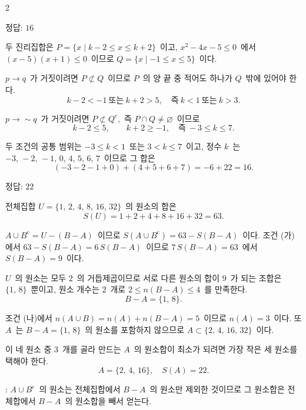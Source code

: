\documentclass[10pt,fleqn]{article}
\begin{document}
\dmsoltitlefirsttrue
\begin{multicols*}{2}

\begin{dmanswerbox}
정답: $16$
\end{dmanswerbox}

두 진리집합은 $P=\{x\mid k-2\le x\le k+2\}$\ 이고, $x^{2}-4x-5\le 0$\ 에서 $(x-5)(x+1)\le 0$\ 이므로 $Q=\{x\mid -1\le x\le 5\}$\ 이다.

$p\to q$\ 가 거짓이려면 $P\not\subset Q$\ 이므로 $P$\ 의 양 끝 중 적어도 하나가 $Q$\ 밖에 있어야 한다.
\[ k-2<-1\ \text{또는}\ k+2>5,\quad\text{즉}\ k<1\ \text{또는}\ k>3. \]

$p\to\sim q$\ 가 거짓이려면 $P\not\subset Q^{\mathrm{c}}$,\ 즉 $P\cap Q\ne\varnothing$\ 이므로
\[ k-2\le 5,\qquad k+2\ge -1,\quad\text{즉}\ -3\le k\le 7. \]

두 조건의 공통 범위는 $-3\le k<1$\ 또는 $3<k\le 7$\ 이고, 정수 $k$\ 는 $-3,\,-2,\,-1,\,0,\,4,\,5,\,6,\,7$\ 이므로 그 합은
\[ (-3-2-1+0)+(4+5+6+7)=-6+22=16. \]
\begin{dmanswerbox}
정답: $22$
\end{dmanswerbox}

전체집합 $U=\{1,\,2,\,4,\,8,\,16,\,32\}$\ 의 원소의 합은
\[ S(U)=1+2+4+8+16+32=63. \]

$A\cup B^{\mathrm{c}}=U-(B-A)$\ 이므로 $S(A\cup B^{\mathrm{c}})=63-S(B-A)$\ 이다. 조건 (가)에서 $63-S(B-A)=6\,S(B-A)$\ 이므로 $7\,S(B-A)=63$\ 에서 $S(B-A)=9$\ 이다.

$U$\ 의 원소는 모두 $2$\ 의 거듭제곱이므로 서로 다른 원소의 합이 $9$\ 가 되는 조합은 $\{1,\,8\}$\ 뿐이고, 원소 개수는 $2$\ 개로 $2\le n(B-A)\le 4$\ 를 만족한다.
\[ B-A=\{1,\,8\}. \]

조건 (나)에서 $n(A\cup B)=n(A)+n(B-A)=5$\ 이므로 $n(A)=3$\ 이다. 또 $A$\ 는 $B-A=\{1,\,8\}$\ 의 원소를 포함하지 않으므로 $A\subset\{2,\,4,\,16,\,32\}$\ 이다.

이 네 원소 중 $3$\ 개를 골라 만드는 $A$\ 의 원소합이 최소가 되려면 가장 작은 세 원소를 택해야 한다.
\[ A=\{2,\,4,\,16\},\quad S(A)=22. \]

\begin{dmcriticalpoint}
: $A\cup B^{\mathrm{c}}$\ 의 원소는 전체집합에서 $B-A$\ 의 원소만 제외한 것이므로 그 원소합은 전체합에서 $B-A$\ 의 원소합을 빼서 얻는다.
\end{dmcriticalpoint}


\end{multicols*}
\end{document}
